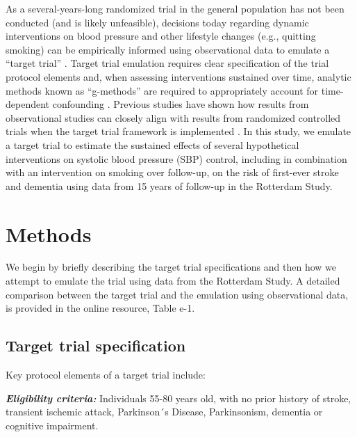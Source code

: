\documentclass[
]{book}
\begin{document}
As a several-years-long randomized trial in the general population has not been conducted (and is likely unfeasible), decisions today regarding dynamic interventions on blood pressure and other lifestyle changes (e.g., quitting smoking) can be empirically informed using observational data to emulate a ``target trial'' \autocite{zhang2018,taubman2009,jain2016,danaei2018,garcia_aymerich2014}. Target trial emulation requires clear specification of the trial protocol elements and, when assessing interventions sustained over time, analytic methods known as ``g-methods'' are required to appropriately account for time-dependent confounding \autocite{whatif2020}. Previous studies have shown how results from observational studies can closely align with results from randomized controlled trials when the target trial framework is implemented \autocite{lodi2019,hernan2008}. In this study, we emulate a target trial to estimate the sustained effects of several hypothetical interventions on systolic blood pressure (SBP) control, including in combination with an intervention on smoking over follow-up, on the risk of first-ever stroke and dementia using data from 15 years of follow-up in the Rotterdam Study.

\hypertarget{methods-1}{%
\section{Methods}\label{methods-1}}

We begin by briefly describing the target trial specifications and then how we attempt to emulate the trial using data from the Rotterdam Study. A detailed comparison between the target trial and the emulation using observational data, is provided in the online resource, Table e-1.

\hypertarget{target-trial-specification}{%
\subsection{Target trial specification}\label{target-trial-specification}}

Key protocol elements of a target trial include:

\textbf{\emph{Eligibility criteria:}} Individuals 55-80 years old, with no prior history of stroke, transient ischemic attack, Parkinson´s Disease, Parkinsonism, dementia or cognitive impairment.
\end{document}
